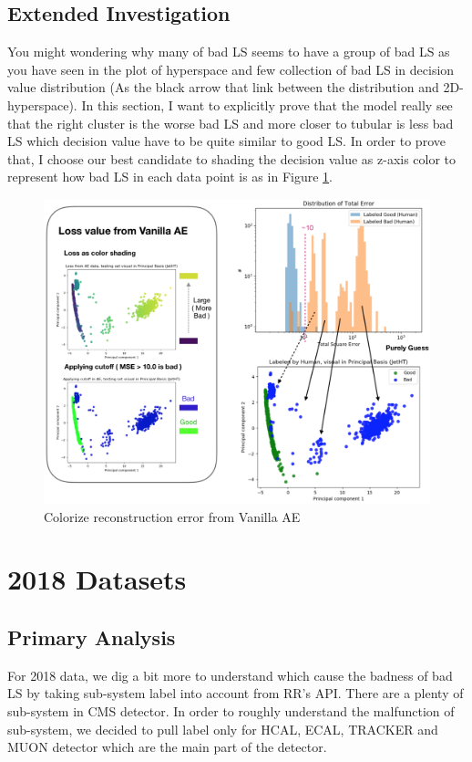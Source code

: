 \subsection{Extended Investigation}
You might wondering why many of bad LS seems to have a group of bad LS as you have seen in the plot of hyperspace and few collection of bad LS in decision value distribution (As the black arrow that link between the distribution and 2D-hyperspace). In this section, I want to explicitly prove that the model really see that the right cluster is the worse bad LS and more closer to tubular is less bad LS which decision value have to be quite similar to good LS. In order to prove that, I choose our best candidate to shading the decision value as z-axis color to represent how bad LS in each data point is as in Figure \ref{fig:2016_guess_visual}.
\begin{figure}[h!]
    \centering
    \includegraphics[width=\textwidth]{images/reco/2016/guess_visual.png}
    \caption{Colorize reconstruction error from Vanilla AE}
    \label{fig:2016_guess_visual}
\end{figure}



\section{2018 Datasets}

\subsection{Primary Analysis}
For 2018 data, we dig a bit more to understand which cause the badness of bad LS by taking sub-system label into account from RR's API. There are a plenty of sub-system in CMS detector. In order to roughly understand the malfunction of sub-system, we decided to pull label only for HCAL, ECAL, TRACKER and MUON detector which are the main part of the detector.

